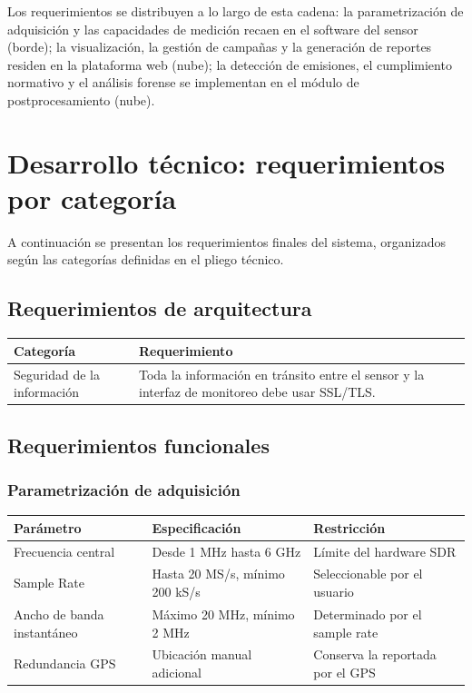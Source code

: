 Los requerimientos se distribuyen a lo largo de esta cadena: la parametrización de adquisición y las capacidades de medición recaen en el software del sensor (borde); la visualización, la gestión de campañas y la generación de reportes residen en la plataforma web (nube); la detección de emisiones, el cumplimiento normativo y el análisis forense se implementan en el módulo de postprocesamiento (nube).

\section{Desarrollo técnico: requerimientos por categoría}

A continuación se presentan los requerimientos finales del sistema, organizados según las categorías definidas en el pliego técnico.

\subsection{Requerimientos de arquitectura}

\begin{tabularx}{\textwidth}{@{}l X@{}}
\toprule
Categoría & Requerimiento \\
\midrule
Seguridad de la información & Toda la información en tránsito entre el sensor y la interfaz de monitoreo debe usar SSL/TLS. \\
\bottomrule
\end{tabularx}

\subsection{Requerimientos funcionales}

\subsubsection{Parametrización de adquisición}

\begin{tabularx}{\textwidth}{@{}l X X@{}}
\toprule
Parámetro & Especificación & Restricción \\
\midrule
Frecuencia central & Desde 1 MHz hasta 6 GHz & Límite del hardware SDR \\
Sample Rate & Hasta 20 MS/s, mínimo 200 kS/s & Seleccionable por el usuario \\
Ancho de banda instantáneo & Máximo 20 MHz, mínimo 2 MHz & Determinado por el sample rate \\
Redundancia GPS & Ubicación manual adicional & Conserva la reportada por el GPS \\
\bottomrule
\end{tabularx}

